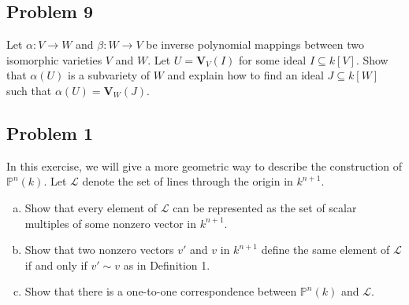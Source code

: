 \documentclass{homework}
\begin{document}
    \setcounter{section}{5}
    \setcounter{subsection}{3}
    \subsection{Problem 9}
    Let $\alpha : V \rightarrow W$ and $\beta : W \rightarrow V$ be inverse polynomial mappings between two isomorphic varieties $V$ and $W$. Let $U = \mathbf V_V(I)$ for some ideal $I \subseteq k[V]$. Show that $\alpha(U)$ is a subvariety of $W$ and explain how to find an ideal $J \subseteq k[W]$ such that $\alpha(U) = \mathbf V_W(J)$.
    
    \setcounter{section}{8}
    \setcounter{subsection}{1}
    \subsection{Problem 1}
    In this exercise, we will give a more geometric way to describe the construction of $\mathbb P^n(k)$. Let $\mathcal L$ denote the set of lines through the origin in $k^{n+1}$.
    \begin{enumerate}[(a)]
        \item Show that every element of $\mathcal L$ can be represented as the set of scalar multiples of some nonzero vector in $k^{n+1}$.
        \item Show that two nonzero vectors $v'$ and $v$ in $k^{n+1}$ define the same element of $\mathcal L$ if and only if $v' \sim v$ as in Definition 1.
        \item Show that there is a one-to-one correspondence between $\mathbb P^n(k)$ and $\mathcal L$.
    \end{enumerate}
\end{document}
